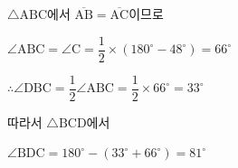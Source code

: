 $\triangle\mathrm{ABC}$에서 $\overline{\mathrm{AB}} = \overline{\mathrm{AC}}$이므로

$\angle\mathrm{ABC} = \angle\mathrm{C} = \dfrac{1}{2}\times (180^\circ - 48^\circ) = 66^\circ$

$\therefore \angle\mathrm{DBC} = \dfrac{1}{2}\angle\mathrm{ABC} = \dfrac{1}{2}\times 66^\circ = 33^\circ$

따라서 $\triangle\mathrm{BCD}$에서

$\angle\mathrm{BDC} = 180^\circ - (33^\circ + 66^\circ) = 81^\circ$
